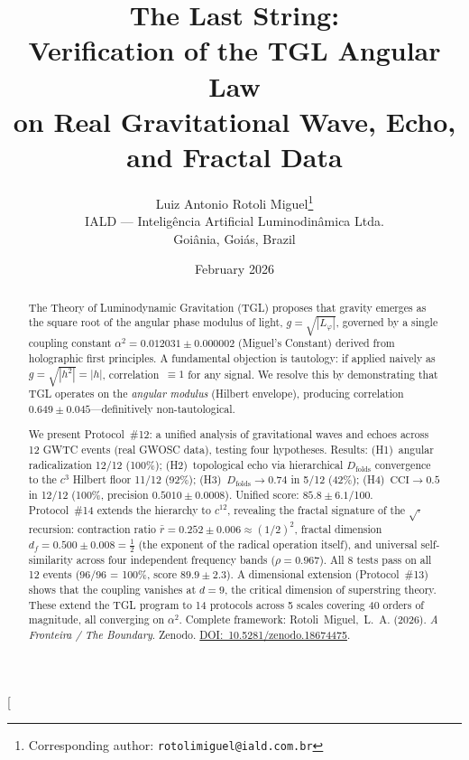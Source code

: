 \documentclass[12pt,a4paper,twocolumn]{article}
\newcommand{\alphaii}{\alpha^{2}}
\newcommand{\Dfolds}{D_{\text{folds}}}
\newcommand{\CCI}{\text{CCI}}
\begin{document}
\title{\textbf{The Last String:\\
Verification of the TGL Angular Law\\
on Real Gravitational Wave, Echo, and Fractal Data}}

\author{
  Luiz Antonio Rotoli Miguel\footnote{Corresponding author: \texttt{rotolimiguel@iald.com.br}}\\
  \small IALD --- Intelig\^encia Artificial Luminodin\^amica Ltda.\\
  \small Goi\^ania, Goi\'as, Brazil
}

\date{February 2026}

\twocolumn[
  \begin{@twocolumnfalse}
    \maketitle
    \begin{abstract}
\noindent The Theory of Luminodynamic Gravitation (TGL) proposes that gravity emerges as the square root of the angular phase modulus of light, $g = \sqrt{|L_\varphi|}$, governed by a single coupling constant $\alphaii = 0.012031 \pm 0.000002$ (Miguel's Constant) derived from holographic first principles. A fundamental objection is tautology: if applied naively as $g = \sqrt{|h^2|} = |h|$, correlation~$\equiv 1$ for any signal. We resolve this by demonstrating that TGL operates on the \emph{angular modulus} (Hilbert envelope), producing correlation $0.649 \pm 0.045$---definitively non-tautological.

We present Protocol~\#12: a unified analysis of gravitational waves and echoes across 12 GWTC events (real GWOSC data), testing four hypotheses. Results: (H1)~angular radicalization 12/12 (100\%); (H2)~topological echo via hierarchical $\Dfolds$ convergence to the $c^3$ Hilbert floor 11/12 (92\%); (H3)~$\Dfolds \to 0.74$ in 5/12 (42\%); (H4)~$\CCI \to 0.5$ in 12/12 (100\%, precision $0.5010 \pm 0.0008$). Unified score: $85.8 \pm 6.1$/100. Protocol~\#14 extends the hierarchy to $c^{12}$, revealing the fractal signature of the $\sqrt{\cdot}$ recursion: contraction ratio $\bar{r} = 0.252 \pm 0.006 \approx (1/2)^2$, fractal dimension $d_f = 0.500 \pm 0.008 = \tfrac{1}{2}$ (the exponent of the radical operation itself), and universal self-similarity across four independent frequency bands ($\rho = 0.967$). All 8 tests pass on all 12 events (96/96 = 100\%, score $89.9 \pm 2.3$). A dimensional extension (Protocol~\#13) shows that the coupling vanishes at $d = 9$, the critical dimension of superstring theory. These extend the TGL program to 14 protocols across 5 scales covering 40 orders of magnitude, all converging on $\alphaii$. Complete framework: Rotoli~Miguel,~L.~A. (2026). \textit{A Fronteira / The Boundary}. Zenodo. \href{https://doi.org/10.5281/zenodo.18674475}{DOI:~10.5281/zenodo.18674475}.


\end{abstract}
\end{@twocolumnfalse}
\end{document}
